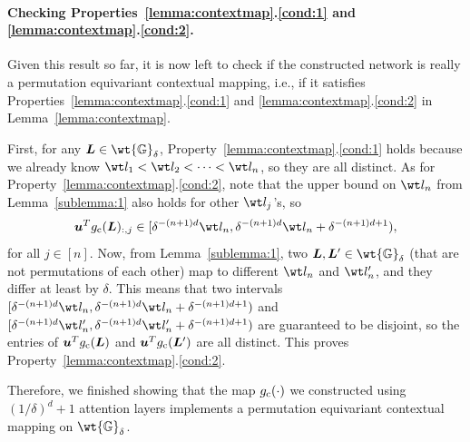 \documentclass{article} %
\def\vu{{\bm{u}}}
\def\mL{{\bm{L}}}
\def\sG{{\mathbb{G}}}
\begin{document}
\paragraph{Checking Properties~\ref{lemma:contextmap}.\ref{cond:1} and  \ref{lemma:contextmap}.\ref{cond:2}.}
Given this result so far, it is now left to check if the constructed network is really a permutation equivariant contextual mapping, i.e., if it satisfies Properties~\ref{lemma:contextmap}.\ref{cond:1} and \ref{lemma:contextmap}.\ref{cond:2} in Lemma~\ref{lemma:contextmap}.

First, for any $\mL \in \wt {\sG}_{\delta}$, Property~\ref{lemma:contextmap}.\ref{cond:1} holds because we already know $\wt l_1 < \wt l_2 < \dots < \wt l_n$, so they are all distinct.
As for Property~\ref{lemma:contextmap}.\ref{cond:2}, note that the upper bound on $\wt l_n$ from Lemma~\ref{sublemma:1} also holds for other $\wt l_j$'s, so
\begin{equation*}
\vu^T g_{\rm c}(\mL)_{:,j} \in [\delta^{-(n+1)d} \wt l_n, \delta^{-(n+1)d} \wt l_n + \delta^{-(n+1)d+1}),
\end{equation*}
for all $j \in [n]$. Now, from Lemma~\ref{sublemma:1}, two $\mL, \mL' \in \wt {\sG}_{\delta}$ (that are not permutations of each other) map to different $\wt l_n$ and $\wt l'_n$, and they differ at least by $\delta$. This means that two intervals $[\delta^{-(n+1)d} \wt l_n, \delta^{-(n+1)d} \wt l_n + \delta^{-(n+1)d+1})$ and $[\delta^{-(n+1)d} \wt l'_n, \delta^{-(n+1)d} \wt l'_n + \delta^{-(n+1)d+1})$ are guaranteed to be disjoint, so the entries of $\vu^T g_{\rm c}(\mL)$ and $\vu^T g_{\rm c}(\mL')$ are all distinct. This proves Property~\ref{lemma:contextmap}.\ref{cond:2}.

Therefore, we finished showing that the map $g_{\rm c}(\cdot)$ we constructed using $(1/\delta)^d+1$ attention layers implements a permutation equivariant contextual mapping on $\wt {\sG}_{\delta}$.
\end{document}
